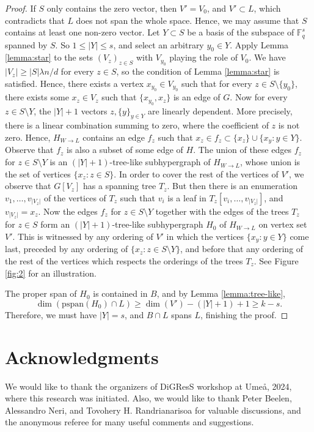 \documentclass[11pt]{article}
\theoremstyle{plain}
\theoremstyle{definition}
\begin{document}
\begin{proof}
If $S$ only contains the zero vector, then $V'=V_0$, and $V'\subset L$, which contradicts that $L$ does not span the whole space. Hence, we may assume that $S$ contains at least one non-zero vector. Let $Y\subset S$ be a basis of the subspace of $\mathbb{F}_q^s$ spanned by $S$. So $1\leq |Y|\leq s$, and select an arbitrary $y_0\in Y$.  Apply Lemma \ref{lemma:star} to the sets $(V_z)_{z\in S}$ with $V_{y_0}$ playing the role of $V_0$. We have $|V_{z}|\geq |S|\lambda n/d$ for every $z\in S$, so the condition of Lemma \ref{lemma:star} is satisfied. Hence, there exists a vertex $x_{y_0}\in V_{y_0}$ such that for every $z\in S\setminus \{y_0\}$, there exists some $x_z\in V_z$ such that $\{x_{y_0},x_z\}$ is an edge of $G$. Now for every $z\in S\setminus Y$, the $|Y|+1$ vectors $z,\{y\}_{y\in Y}$ are linearly dependent. More precisely, there is a linear combination summing to zero, where the coefficient of $z$ is not zero. Hence, $H_{W\rightarrow L}$ contains an edge $f_{z}$ such that $x_{z}\in f_{z}\subset \{x_{z}\}\cup \{x_y:y\in Y\}$. Observe that $f_{z}$ is also a subset of some edge of $H$. The union of these edges $f_{z}$ for $z\in S\setminus Y$ is an $(|Y|+1)$-tree-like subhypergraph of $H_{W\rightarrow L}$, whose union is the set of vertices $\{x_{z}:z\in S\}$. In order to cover the rest of the vertices of $V'$, we observe that $G[V_z]$ has a spanning tree $T_z$. But then there is an enumeration $v_1,\dots,v_{|V_z|}$ of the vertices of $T_z$ such that $v_i$ is a leaf in $T_z[v_i,\dots,v_{|V_z|}]$, and $v_{|V_z|}=x_z$. Now the edges $f_{z}$ for $z\in S\setminus Y$ together with the edges of the trees $T_z$ for $z\in S$ form an $(|Y|+1)$-tree-like subhypergraph $H_0$ of $H_{W\rightarrow L}$ on vertex set $V'$. This is witnessed by any ordering of $V'$ in which the vertices $\{x_y:y\in Y\}$ come last, preceded by any ordering of $\{x_z:z\in S\setminus Y\}$, and before that any ordering of the rest of the vertices which respects the orderings of the trees $T_z$. See Figure \ref{fig:2} for an illustration.

The proper span of $H_0$ is contained in $B$, and by Lemma \ref{lemma:tree-like}, 
$$\dim(\mbox{pspan}(H_0)\cap L)\geq \dim(V')-(|Y|+1)+1\geq k-s.$$
Therefore, we must have $|Y|=s$, and $B\cap L$ spans $L$, finishing the proof.
\end{proof}

\section*{Acknowledgments}
We would like to thank the organizers of DiGResS workshop at Ume\r{a}, 2024, where this research was initiated. Also, we would like to thank  Peter Beelen, Alessandro Neri, and Tovohery H. Randrianarisoa for valuable discussions, and the anonymous referee for many useful comments and suggestions.
\end{document}
